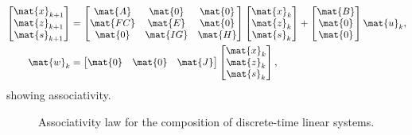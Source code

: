 \begin{equation*}
    \label{eq:dlin-7}
    \begin{aligned}
        \begin{bmatrix}
            \mat{x}_{k+1} \\
            \mat{z}_{k+1} \\
            \mat{s}_{k+1}
        \end{bmatrix} & =
        \begin{bmatrix}
            \mat{A}  & \mat{0}  & \mat{0} \\
            \mat{FC} & \mat{E}  & \mat{0} \\
            \mat{0}  & \mat{IG} & \mat{H}
        \end{bmatrix}
        \begin{bmatrix}
            \mat{x}_k \\ \mat{z}_k\\ \mat{s}_k
        \end{bmatrix}+
        \begin{bmatrix}
            \mat{B} \\ \mat{0}\\ \mat{0}
        \end{bmatrix}\mat{u}_k, \\
        \mat{w}_k                         & =
        \begin{bmatrix}
            \mat{0} & \mat{0} & \mat{J}
        \end{bmatrix}
        \begin{bmatrix}
            \mat{x}_k \\ \mat{z}_k\\ \mat{s}_k
        \end{bmatrix},
    \end{aligned}
\end{equation*}
showing associativity.

\begin{figure}[tbh]
    \centering
    \prflinepadbefore=5pt
    \prflinepadafter=5pt
    {
    }
    \caption{Associativity law for the composition of discrete-time linear systems. }
    \label{fig:ass_dyn_syst}
\end{figure}


